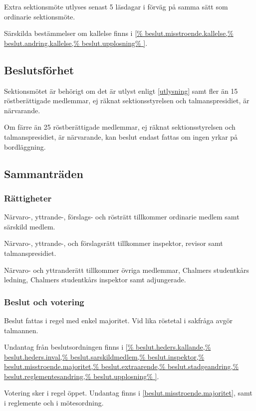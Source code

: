 \documentclass{styrdokument}
\begin{document}
\? Extra sektionsmöte utlyses senast 5 läsdagar i förväg på samma sätt som ordinarie sektionsmöte.

\? Särskilda bestämmelser om kallelse finns i
\cref{%
  beslut.misstroende.kallelse,%
  beslut.andring.kallelse,%
  beslut.upplosning%
}.

\subsection{Beslutsförhet}

\? Sektionsmötet är behörigt om det är utlyst enligt \cref{utlysning} samt fler än 15 röstberättigade medlemmar, ej räknat sektionsstyrelsen och talmanspresidiet, är närvarande.

\? Om färre än 25 röstberättigade medlemmar, ej räknat sektionsstyrelsen och talmanspresidiet, är närvarande, kan beslut endast fattas om ingen yrkar på bordläggning.

\subsection{Sammanträden}

\subsubsection{Rättigheter}
\? Närvaro-, yttrande-, förslags- och rösträtt tillkommer ordinarie medlem samt särskild medlem.
\label{ratt.sektmote.rost}

\? Närvaro-, yttrande-, och förslagsrätt tillkommer inspektor, revisor samt talmanspresidiet.

\? Närvaro- och yttranderätt tillkommer övriga medlemmar, Chalmers studentkårs ledning, Chalmers studentkårs inspektor samt adjungerade.
\label{ratt.sektmote.grund}

\subsubsection{Beslut och votering}
\? Beslut fattas i regel med enkel majoritet.
Vid lika röstetal i sakfråga avgör talmannen.

\? Undantag från beslutsordningen finns i
\cref{%
  beslut.heders.kallande,%
  beslut.heders.inval,%
  beslut.sarskildmedlem,%
  beslut.inspektor,%
  beslut.misstroende.majoritet,%
  beslut.extraarende,%
  beslut.stadgeandring,%
  beslut.reglementesandring,%
  beslut.upplosning%
}.
  
\? Votering sker i regel öppet. Undantag finns i
\cref{beslut.misstroende.majoritet},
samt i reglemente och i mötesordning.
\end{document}
